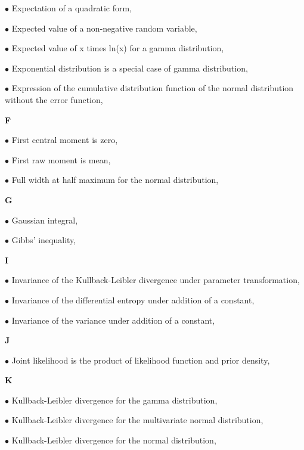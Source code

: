 \documentclass[a4paper,12pt,twoside]{book}
\begin{document}
$\bullet$ Expectation of a quadratic form, \pageref{sec:mean-qf}

$\bullet$ Expected value of a non-negative random variable, \pageref{sec:mean-nnrvar}

$\bullet$ Expected value of x times ln(x) for a gamma distribution, \pageref{sec:gam-xlogx}

$\bullet$ Exponential distribution is a special case of gamma distribution, \pageref{sec:exp-gam}

$\bullet$ Expression of the cumulative distribution function of the normal distribution without the error function, \pageref{sec:norm-cdfwerf}


\vspace{1em}
\textbf{F}

$\bullet$ First central moment is zero, \pageref{sec:momcent-1st}

$\bullet$ First raw moment is mean, \pageref{sec:momraw-1st}

$\bullet$ Full width at half maximum for the normal distribution, \pageref{sec:norm-fwhm}


\vspace{1em}
\textbf{G}

$\bullet$ Gaussian integral, \pageref{sec:norm-gi}

$\bullet$ Gibbs' inequality, \pageref{sec:gibbs-ineq}


\vspace{1em}
\textbf{I}

$\bullet$ Invariance of the Kullback-Leibler divergence under parameter transformation, \pageref{sec:kl-inv}

$\bullet$ Invariance of the differential entropy under addition of a constant, \pageref{sec:dent-inv}

$\bullet$ Invariance of the variance under addition of a constant, \pageref{sec:var-inv}


\vspace{1em}
\textbf{J}

$\bullet$ Joint likelihood is the product of likelihood function and prior density, \pageref{sec:jl-lfnprior}


\vspace{1em}
\textbf{K}

$\bullet$ Kullback-Leibler divergence for the gamma distribution, \pageref{sec:gam-kl}

$\bullet$ Kullback-Leibler divergence for the multivariate normal distribution, \pageref{sec:mvn-kl}

$\bullet$ Kullback-Leibler divergence for the normal distribution, \pageref{sec:norm-kl}
\end{document}
